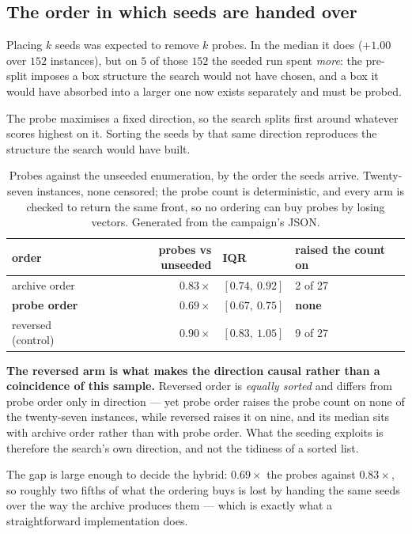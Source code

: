 \documentclass[11pt,a4paper]{article}
\begin{document}
\subsection{The order in which seeds are handed over}
\label{sec:order}

Placing $k$ seeds was expected to remove $k$ probes.  In the median it does
($+1.00$ over $152$ instances), but on $5$ of those $152$ the seeded run spent
\emph{more}: the pre-split imposes a box structure the search would not have
chosen, and a box it would have absorbed into a larger one now exists
separately and must be probed.

The probe maximises a fixed direction, so the search splits first around
whatever scores highest on it.  Sorting the seeds by that same direction
reproduces the structure the search would have built.

\begin{table}[h]
\centering
\caption{Probes against the unseeded enumeration, by the order the seeds
arrive.  Twenty-seven instances, none censored; the probe count is
deterministic, and every arm is checked to return the same front, so no
ordering can buy probes by losing vectors.  Generated from the campaign's
JSON.}
\label{tab:order}
\begin{tabular}{lrll}
\toprule
order & probes vs unseeded & IQR & raised the count on \\
\midrule
archive order & $0.83\times$ & $[0.74,\ 0.92]$ & 2 of 27 \\
\textbf{probe order} & $\mathbf{0.69}\times$ & $[0.67,\ 0.75]$ & \textbf{none} \\
reversed (control) & $0.90\times$ & $[0.83,\ 1.05]$ & 9 of 27 \\
\bottomrule
\end{tabular}
\end{table}

\noindent
\textbf{The reversed arm is what makes the direction causal rather than a
coincidence of this sample.}  Reversed order is \emph{equally sorted} and
differs from probe order only in direction --- yet probe order raises the probe
count on none of the twenty-seven instances, while reversed raises it on nine,
and its median sits with archive order rather than with probe order.  What the
seeding exploits is therefore the search's own direction, and not the
tidiness of a sorted list.

The gap is large enough to decide the hybrid: $0.69\times$ the probes against
$0.83\times$, so roughly two fifths of what the ordering buys is lost by
handing the same seeds over the way the archive produces them --- which is
exactly what a straightforward implementation does.
\end{document}
